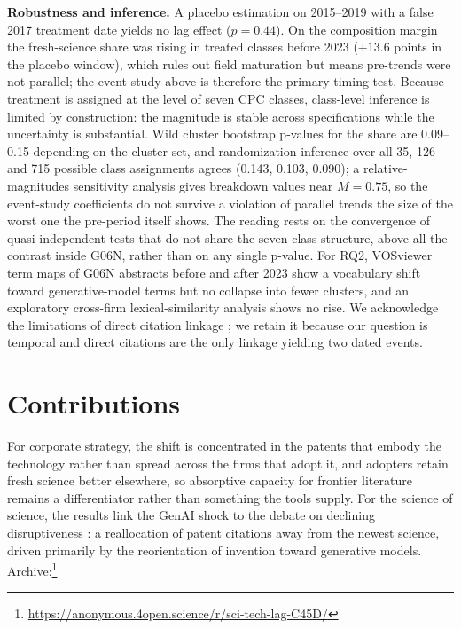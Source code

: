 \documentclass[
]{ceurart}
\begin{document}
\textbf{Robustness and inference.} A placebo estimation on 2015--2019 with a false 2017 treatment date yields no lag effect ($p=0.44$). On the composition margin the fresh-science share was rising in treated classes before 2023 ($+13.6$ points in the placebo window), which rules out field maturation but means pre-trends were not parallel; the event study above is therefore the primary timing test. Because treatment is assigned at the level of seven CPC classes, class-level inference is limited by construction: the magnitude is stable across specifications while the uncertainty is substantial. Wild cluster bootstrap p-values for the share are 0.09--0.15 depending on the cluster set, and randomization inference over all 35, 126 and 715 possible class assignments agrees (0.143, 0.103, 0.090); a relative-magnitudes sensitivity analysis \cite{rambachan2023} gives breakdown values near $M=0.75$, so the event-study coefficients do not survive a violation of parallel trends the size of the worst one the pre-period itself shows. The reading rests on the convergence of quasi-independent tests that do not share the seven-class structure, above all the contrast inside G06N, rather than on any single p-value. For RQ2, VOSviewer term maps \cite{vaneck2010vosviewer} of G06N abstracts before and after 2023 show a vocabulary shift toward generative-model terms but no collapse into fewer clusters, and an exploratory cross-firm lexical-similarity analysis shows no rise. We acknowledge the limitations of direct citation linkage \cite{denter2025novelty}; we retain it because our question is temporal and direct citations are the only linkage yielding two dated events.

\section{Contributions}

For corporate strategy, the shift is concentrated in the patents that embody the technology rather than spread across the firms that adopt it, and adopters retain fresh science better elsewhere, so absorptive capacity for frontier literature remains a differentiator rather than something the tools supply. For the science of science, the results link the GenAI shock to the debate on declining disruptiveness \cite{park2023papers}: a reallocation of patent citations away from the newest science, driven primarily by the reorientation of invention toward generative models. Archive:\footnote{\url{https://anonymous.4open.science/r/sci-tech-lag-C45D/}}
\end{document}
